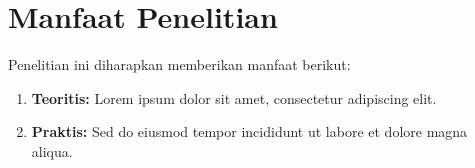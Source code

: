 \section{Manfaat Penelitian}


Penelitian ini diharapkan memberikan manfaat berikut:

\begin{enumerate}
  \item \textbf{Teoritis:} Lorem ipsum dolor sit amet, consectetur adipiscing elit.
  \item \textbf{Praktis:} Sed do eiusmod tempor incididunt ut labore et dolore magna aliqua.
\end{enumerate}
